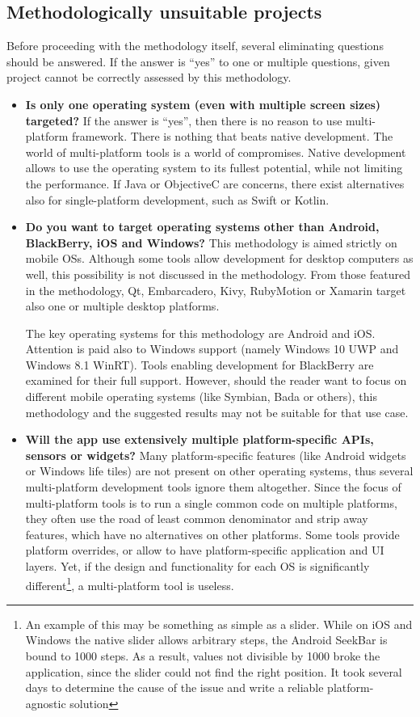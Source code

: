 \documentclass[english,master,public,dept460,male,cpdeclaration,oneside]{diploma}
\begin{document}
\subsection{Methodologically unsuitable projects}

Before proceeding with the methodology itself, several eliminating questions should be answered. If the answer is “yes” to one or multiple questions, given project cannot be correctly assessed by this methodology.

\begin{itemize}
	\item \textbf{Is only one operating system (even with multiple screen sizes) targeted?} 
	If the answer is “yes”, then there is no reason to use multi-platform framework. There is nothing that beats native development. The world of multi-platform tools is a world of compromises. Native development allows to use the operating system to its fullest potential, while not limiting the performance. If Java or ObjectiveC are concerns, there exist alternatives also for single-platform development, such as Swift or Kotlin.
	
	\item \textbf{Do you want to target operating systems other than Android, BlackBerry, iOS and Windows?} 
	This methodology is aimed strictly on mobile OSs. Although some tools allow development for desktop computers as well, this possibility is not discussed in the methodology. From those featured in the methodology, Qt, Embarcadero, Kivy, RubyMotion or Xamarin target also one or multiple desktop platforms. 
	
	The key operating systems for this methodology are Android and iOS. Attention is paid also to Windows support (namely Windows 10 UWP and Windows 8.1 WinRT). Tools enabling development for BlackBerry are examined for their full support. However, should the reader want to focus on different mobile operating systems (like Symbian, Bada or others), this methodology and the suggested results may not be suitable for that use case.
	
	\item \textbf{Will the app use extensively multiple platform-specific APIs, sensors or widgets?} 
	Many platform-specific features (like Android widgets or Windows life tiles) are not present on other operating systems, thus several multi-platform development tools ignore them altogether. Since the focus of multi-platform tools is to run a single common code on multiple platforms, they often use the road of least common denominator and strip away features, which have no alternatives on other platforms. Some tools provide platform overrides, or allow to have platform-specific application and UI layers. Yet, if the design and functionality for each OS is significantly different\footnote{An example of this may be something as simple as a slider. While on iOS and Windows the native slider allows arbitrary steps, the Android SeekBar is bound to 1000 steps. As a result, values not divisible by 1000 broke the application, since the slider could not find the right position. It took several days to determine the cause of the issue and write a reliable platform-agnostic solution}, a multi-platform tool is useless. 
	

\end{itemize}
\end{document}

